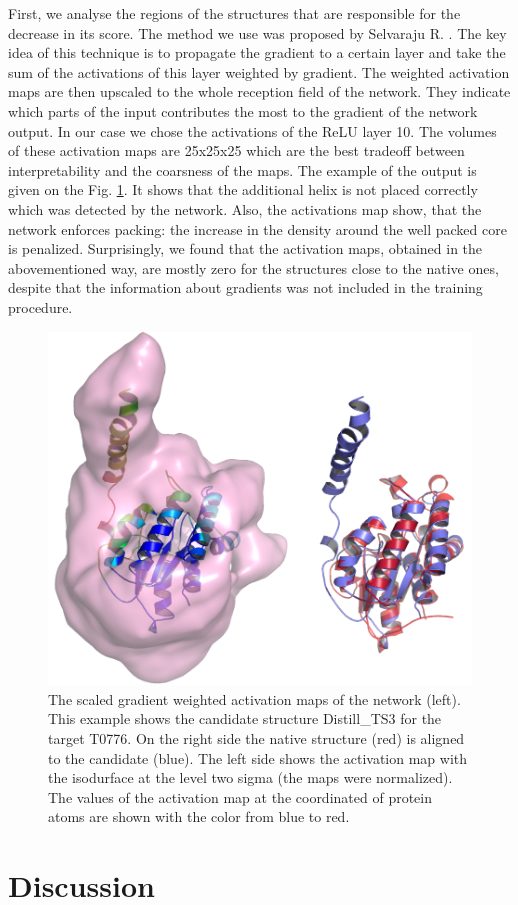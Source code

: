 \documentclass[a4paper,10pt]{article}
\begin{document}
First, we analyse the regions of the structures that are responsible for the decrease in its score. The method we use was proposed 
by Selvaraju R. \cite{selvaraju2016grad}. The key idea of this technique is to propagate the gradient to a certain layer and take the sum of the 
activations of this layer weighted by gradient. The weighted activation maps are then upscaled to the whole reception field of the network.
They indicate which parts of the input contributes the most to the gradient of the network output. In our case we chose the activations 
of the ReLU layer 10. The volumes of these activation maps are 25x25x25 which are the best tradeoff between interpretability and the coarsness 
of the maps. The example of the output is given on the Fig. \ref{Fig:GradCAMT0776}. 
It shows that the additional helix is not placed correctly which was detected
by the network. Also, the activations map show, that the network enforces packing: the increase in the density 
around the well packed core is penalized. Surprisingly, we found that the activation maps, obtained in the abovementioned way, 
are mostly zero for the structures close to the native ones, despite that the information about gradients was not included in 
the training procedure. 

\begin{figure}[H]
    \centering
    \includegraphics[width=\linewidth]{Fig/FigT0776.png}
    \caption{The scaled gradient weighted activation maps of the network (left). This example shows the candidate structure Distill\_TS3 for 
    the target T0776. On the right side the native structure (red) is aligned to the candidate (blue). The left side shows the activation 
    map with the isodurface at the level two sigma (the maps were normalized). The values of the activation map at the coordinated of protein
    atoms are shown with the color from blue to red.}
    \label{Fig:GradCAMT0776}
\end{figure}



\section{Discussion}

{}

\end{document}
